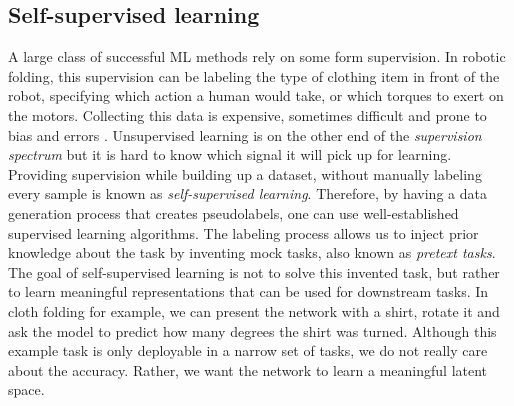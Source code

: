 \documentclass[\home/main.tex]{subfiles}
\begin{document}
\subsection{Self-supervised learning} \label{subsec:lit_ssl}
A large class of successful \gls{ML} methods rely on some form supervision. In robotic folding, this supervision can be labeling the type of clothing item in front of the robot, specifying which action a human would take, or which torques to exert on the motors. Collecting this data is expensive, sometimes difficult and prone to bias and errors \autocite{mehrabi2021survey}. Unsupervised learning is on the other end of the \textit{supervision spectrum} but it is hard to know which signal it will pick up for learning. Providing supervision while building up a dataset, without manually labeling every sample is known as \emph{self-supervised learning}. Therefore, by having a data generation process that creates pseudolabels, one can use well-established supervised learning algorithms. The labeling process allows us to inject prior knowledge about the task by inventing mock tasks, also known as \emph{pretext tasks}. The goal of self-supervised learning is not to solve this invented task, but rather to learn meaningful representations that can be used for downstream tasks. In cloth folding for example, we can present the network with a shirt, rotate it and ask the model to predict how many degrees the shirt was turned. Although this example task is only deployable in a narrow set of tasks, we do not really care about the accuracy. Rather, we want the network to learn a meaningful latent space.
\end{document}

